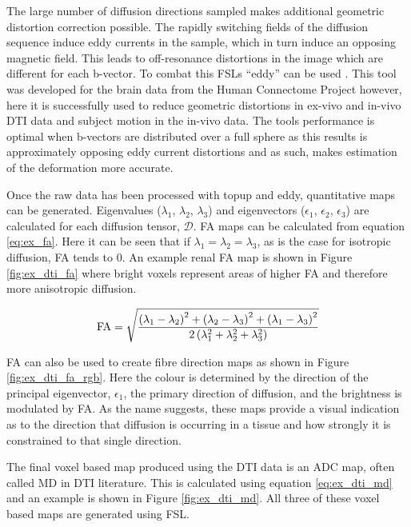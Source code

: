 The large number of diffusion directions sampled makes additional geometric distortion correction possible. The rapidly switching fields of the diffusion sequence induce eddy currents in the sample, which in turn induce an opposing magnetic field. This leads to off-resonance distortions in the image which are different for each b-vector. To combat this \ac{FSL}s ``eddy'' can be used \cite{andersson_integrated_2016}. This tool was developed for the brain data from the Human Connectome Project \cite{andersson_non-parametric_2015} however, here it is successfully used to reduce geometric distortions in ex-vivo and in-vivo \ac{DTI} data and subject motion in the in-vivo data. The tools performance is optimal when b-vectors are distributed over a full sphere as this results is approximately opposing eddy current distortions and as such, makes estimation of the deformation more accurate.

\newpage
Once the raw data has been processed with topup and eddy, quantitative maps can be generated. Eigenvalues ($\lambda_1$, $\lambda_2$, $\lambda_3$) and eigenvectors ($\epsilon_1$, $\epsilon_2$, $\epsilon_3$) are calculated for each diffusion tensor, $\mathscr{D}$. \ac{FA} maps can be calculated from equation \eqref{eq:ex_fa}. Here it can be seen that if $\lambda_1 = \lambda_2 = \lambda_3$, as is the case for isotropic diffusion, \ac{FA} tends to 0. An example renal \ac{FA} map is shown in Figure \ref{fig:ex_dti_fa} where bright voxels represent areas of higher \ac{FA} and therefore more anisotropic diffusion.

\begin{equation}
	\textup{FA} = \sqrt{\frac{\left(\lambda_1 - \lambda_2\right)^2 + \left(\lambda_2 - \lambda_3\right)^2 + \left(\lambda_1 - \lambda_3\right)^2}{2\left( \lambda_1^2 + \lambda_2^2 + \lambda_3^2\right)}}
		\label{eq:ex_fa}
\end{equation}

\ac{FA} can also be used to create fibre direction maps as shown in Figure \ref{fig:ex_dti_fa_rgb}. Here the colour is determined by the direction of the principal eigenvector, $\epsilon_1$, the primary direction of diffusion, and the brightness is modulated by \ac{FA}. As the name suggests, these maps provide a visual indication as to the direction that diffusion is occurring in a tissue and how strongly it is constrained to that single direction.

The final voxel based map produced using the \ac{DTI} data is an \ac{ADC} map, often called \ac{MD} in \ac{DTI} literature. This is calculated using equation \eqref{eq:ex_dti_md} and an example is shown in Figure \ref{fig:ex_dti_md}. All three of these voxel based maps are generated using \ac{FSL}.

